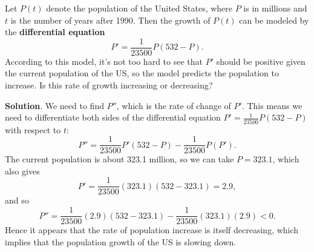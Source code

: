 \documentclass[10pt,]{book}
\newcommand{\terminology}[1]{\textbf{#1}}
\theoremstyle{ptxplainnotitle}
\theoremstyle{ptxplaintitle}
\theoremstyle{ptxplainnotitle}
\theoremstyle{ptxplaintitle}
\theoremstyle{ptxplainnotitle}
\theoremstyle{ptxplaintitle}
\theoremstyle{ptxdefinitionnotitle}
\theoremstyle{ptxdefinitiontitle}
\theoremstyle{ptxdefinitionnotitle}
\theoremstyle{ptxdefinitiontitle}
\theoremstyle{ptxdefinitionnotitle}
\theoremstyle{ptxdefinitiontitle}
\theoremstyle{ptxdefinitionnotitle}
\theoremstyle{ptxdefinitiontitle}
\theoremstyle{ptxdefinitionnotitle}
\theoremstyle{ptxdefinitiontitle}
\numberwithin{equation}{section}
\begin{document}
\begin{example}\label{example-a-differential-equation}
\hypertarget{p-167}{}%
Let \(P(t)\) denote the population of the United States, where \(P\) is in millions and \(t\) is the number of years after 1990. Then the growth of \(P(t)\) can be modeled by the \terminology{differential equation}%
\begin{equation*}
P' = \frac{1}{23500}P(532-P).
\end{equation*}
According to this model, it's not too hard to see that \(P'\) should be positive given the current population of the US, so the model predicts the population to increase. Is this rate of growth increasing or decreasing?%
\par\smallskip%
\noindent\textbf{Solution}.\hypertarget{solution-36}{}\quad%
\hypertarget{p-168}{}%
We need to find \(P''\), which is the rate of change of \(P'\). This means we need to differentiate both sides of the differential equation \(P' = \frac{1}{23500}P(532-P)\) with respect to \(t\):%
\begin{equation*}
P'' = \frac{1}{23500}P'(532-P) - \frac{1}{23500}P(P').
\end{equation*}
The current population is about 323.1 million, so we can take \(P=323.1\), which also gives%
\begin{equation*}
P' = \frac{1}{23500}(323.1)(532-323.1) = 2.9,
\end{equation*}
and so%
\begin{equation*}
P'' = \frac{1}{23500}(2.9)(532-323.1) - \frac{1}{23500}(323.1)(2.9) < 0.
\end{equation*}
Hence it appears that the rate of population increase is itself decreasing, which implies that the population growth of the US is slowing down.%
\end{example}
\typeout{************************************************}
\typeout{************************************************}
\end{document}
